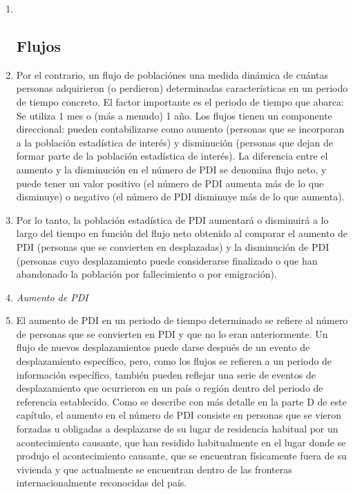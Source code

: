 \documentclass[
]{book}
\begin{document}
\begin{enumerate}
\def\labelenumi{\arabic{enumi}.}
\item ~
  \hypertarget{flujos}{%
  \subsection{Flujos}\label{flujos}}
\item
  Por el contrario, un flujo de poblaciónes una medida dinámica de cuántas personas adquirieron (o perdieron) determinadas características en un periodo de tiempo concreto. El factor importante es el periodo de tiempo que abarca: Se utiliza 1 mes o (más a menudo) 1 año. Los flujos tienen un componente direccional: pueden contabilizarse como aumento (personas que se incorporan a la población estadística de interés) y disminución (personas que dejan de formar parte de la población estadística de interés). La diferencia entre el aumento y la disminución en el número de PDI se denomina flujo neto, y puede tener un valor positivo (el número de PDI aumenta más de lo que disminuye) o negativo (el número de PDI disminuye más de lo que aumenta).
\item
  Por lo tanto, la población estadística de PDI aumentará o disminuirá a lo largo del tiempo en función del flujo neto obtenido al comparar el aumento de PDI (personas que se convierten en desplazadas) y la disminución de PDI (personas cuyo desplazamiento puede considerarse finalizado o que han abandonado la población por fallecimiento o por emigración).
\item
  \emph{Aumento de PDI}
\item
  El aumento de PDI en un periodo de tiempo determinado se refiere al número de personas que se convierten en PDI y que no lo eran anteriormente. Un flujo de nuevos desplazamientos puede darse después de un evento de desplazamiento específico, pero, como los flujos se refieren a un periodo de información específico, también pueden reflejar una serie de eventos de desplazamiento que ocurrieron en un país o región dentro del periodo de referencia establecido. Como se describe con más detalle en la parte D de este capítulo, el aumento en el número de PDI consiste en personas que se vieron forzadas u obligadas a desplazarse de su lugar de residencia habitual por un acontecimiento causante, que han residido habitualmente en el lugar donde se produjo el acontecimiento causante, que se encuentran físicamente fuera de su vivienda y que actualmente se encuentran dentro de las fronteras internacionalmente reconocidas del país.

\end{enumerate}
\end{document}
